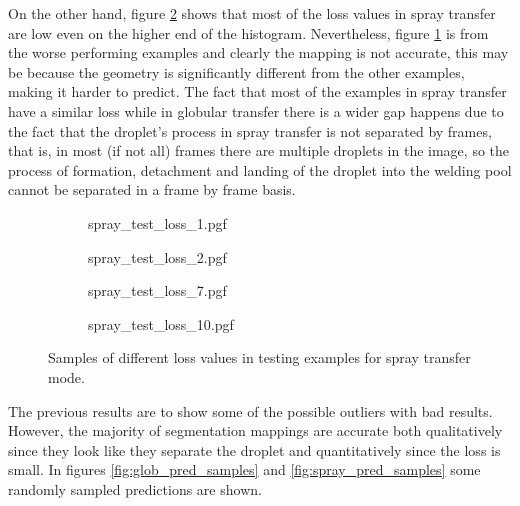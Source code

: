 On the other hand, figure \ref{fig:spray_loss_samples} shows that most of the loss values in spray transfer are low even on the higher end of the histogram. Nevertheless, figure \ref{fig:spray_loss_samples_d} is from the worse performing examples and clearly the mapping is not accurate, this may be because the geometry is significantly different from the other examples, making it harder to predict. The fact that most of the examples in spray transfer have a similar loss while in globular transfer there is a wider gap happens due to the fact that the droplet's process in spray transfer is not separated by frames, that is, in most (if not all) frames there are multiple droplets in the image, so the process of formation, detachment and landing of the droplet into the welding pool cannot be separated in a frame by frame basis.

\begin{figure}
  \begin{subfigure}[b]{0.45\textwidth}
    {spray_test_loss_1.pgf}
    \caption{}
  \end{subfigure}
\hfill
  \begin{subfigure}[b]{0.45\textwidth}
    {spray_test_loss_2.pgf}
    \caption{}
  \end{subfigure}
 \vfill
  \begin{subfigure}[b]{0.45\textwidth}
    {spray_test_loss_7.pgf}
    \caption{}
  \end{subfigure}
\hfill
  \begin{subfigure}[b]{0.45\textwidth}
    {spray_test_loss_10.pgf}
    \caption{}
    \label{fig:spray_loss_samples_d}
  \end{subfigure}
  \caption[Samples of different loss values in testing examples for spray transfer mode]{Samples of different loss values in testing examples for spray transfer mode.}
  \label{fig:spray_loss_samples}
\end{figure}

The previous results are to show some of the possible outliers with bad results. However, the majority of segmentation mappings are accurate both qualitatively since they look like they separate the droplet and quantitatively since the loss is small. In figures \ref{fig:glob_pred_samples} and \ref{fig:spray_pred_samples} some randomly sampled predictions are shown.

